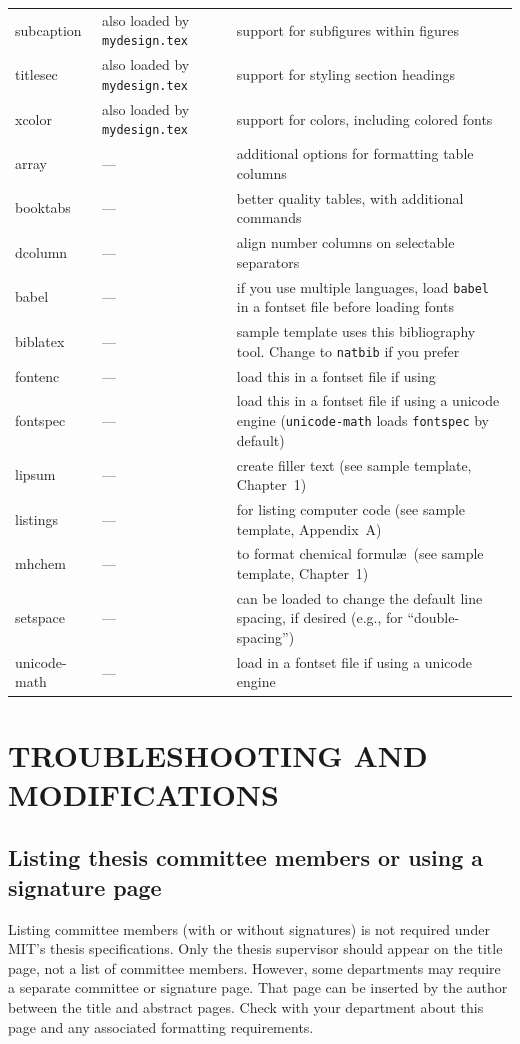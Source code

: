 \documentclass[11pt]{article}
\newcommand*\pdfTeX{\hologo{pdfTeX}}
\begin{document}
\begin{table}
{\begin{tabular*}{\textwidth}{>{\ttfamily}l<{}@{\extracolsep{\fill}}p{18em} p{22em} }
subcaption & also loaded by \texttt{mydesign.tex}		& support for subfigures within figures \\
titlesec   & also loaded by \texttt{mydesign.tex} 		& support for styling section headings \\
xcolor	   & also loaded by \texttt{mydesign.tex} 		& support for colors, including colored fonts \\[0.7em]
array	   & --- & additional options for formatting table columns \\
booktabs   & --- & better quality tables, with additional commands \\
dcolumn    & --- & align number columns on selectable separators \\
\midrule
babel	 & --- & if you use multiple languages, load \texttt{babel} in a fontset file before loading fonts \\
biblatex & --- & sample template uses this bibliography tool. Change to \texttt{natbib} if you prefer\\
fontenc	 & --- & load this in a fontset file if using \pdfTeX\\
fontspec & --- & load this in a fontset file if using a unicode engine (\texttt{unicode-math} loads \texttt{fontspec} by default)\\
lipsum   & --- & create filler text (see sample template, Chapter~1) \\
listings & --- & for listing computer code (see sample template, Appendix~A) \\
mhchem   & --- & to format chemical formul\ae\ (see sample template, Chapter~1) \\
setspace & --- & can be loaded to change the default line spacing, if desired (e.g., for ``double-spacing'')\\
unicode-math & --- & load in a fontset file if using a unicode engine\\
\bottomrule
\end{tabular*}}%
\end{table}

\section{TROUBLESHOOTING AND MODIFICATIONS}

\subsection{Listing thesis committee members or using a signature page}
Listing committee members (with or without signatures) is not required under MIT's thesis specifications. Only the thesis supervisor should appear on the title page, not a list of committee members.  However, some departments may require a separate committee or signature page.  That page can be inserted by the author between the title and abstract pages.  Check with your department about this page and any associated formatting requirements. 
\end{document}
